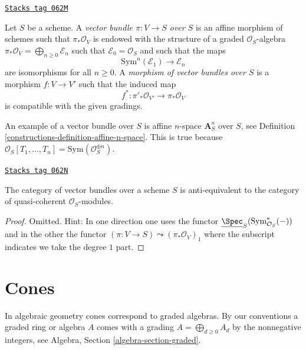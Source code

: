 \begin{definition}
\label{constructions-definition-abstract-vector-bundle}
\href{https://stacks.math.columbia.edu/tag/062M}{\texttt{Stacks tag 062M}}

Let $S$ be a scheme. A {\it vector bundle $\pi : V \to S$ over $S$} is an
affine morphism of schemes such that $\pi_*\mathcal{O}_V$ is endowed with
the structure of a graded $\mathcal{O}_S$-algebra
$\pi_*\mathcal{O}_V = \bigoplus\nolimits_{n \geq 0} \mathcal{E}_n$
such that $\mathcal{E}_0 = \mathcal{O}_S$ and such that the maps
$$
\text{Sym}^n(\mathcal{E}_1) \longrightarrow \mathcal{E}_n
$$
are isomorphisms for all $n \geq 0$. A {\it morphism of vector bundles
over $S$} is a morphism $f : V \to V'$ such that the induced map
$$
f^* : \pi'_*\mathcal{O}_{V'} \longrightarrow \pi_*\mathcal{O}_V
$$
is compatible with the given gradings.
\end{definition}

An example of a vector bundle over $S$ is affine $n$-space
$\mathbf{A}^n_S$ over $S$, see Definition \ref{constructions-definition-affine-n-space}.
This is true because
$\mathcal{O}_S[T_1, \ldots, T_n] = \text{Sym}(\mathcal{O}_S^{\oplus n})$.

\begin{lemma}
\label{constructions-lemma-category-vector-bundles}
\href{https://stacks.math.columbia.edu/tag/062N}{\texttt{Stacks tag 062N}}

The category of vector bundles over a scheme $S$ is
anti-equivalent to the category of quasi-coherent $\mathcal{O}_S$-modules.
\end{lemma}

\begin{proof}
Omitted. Hint: In one direction one uses the functor
$\underline{\Spec}_S(\text{Sym}^*_{\mathcal{O}_S}(-))$
and in the other the functor
$(\pi : V \to S) \leadsto (\pi_*\mathcal{O}_V)_1$ where the subscript
indicates we take the degree $1$ part.
\end{proof}

\section{Cones}
\label{constructions-section-cone}
In algebraic geometry cones correspond to graded algebras. By our conventions
a graded ring or algebra $A$ comes with a grading
$A = \bigoplus_{d \geq 0} A_d$ by the nonnegative integers, see
Algebra, Section \ref{algebra-section-graded}.


